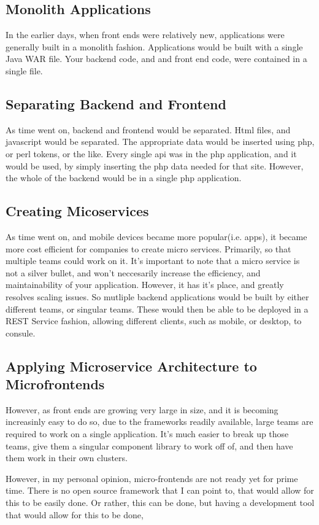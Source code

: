 \subsection{Monolith Applications}
In the earlier days, when front ends were relatively new, applications were generally built in a monolith fashion. Applications would be built with a single Java WAR file. Your backend code, and and front end code, were contained in a single file. 

\subsection{Separating Backend and Frontend}
As time went on, backend and frontend would be separated. Html files, and javascript would be separated. The appropriate data would be inserted using php, or perl tokens, or the like. Every single api was in the php application, and it would be used, by simply inserting the php data needed for that site. However, the whole of the backend would be in a single php application. 

\subsection{Creating Micoservices}
As time went on, and mobile devices became more popular(i.e. apps), it became more cost efficient for companies to create micro services. Primarily, so that multiple teams could work on it. It's important to note that a micro service is not a silver bullet, and won't neccesarily increase the efficiency, and maintainability of your application. However, it has it's place, and greatly resolves scaling issues. So mutliple backend applications would be built by either different teams, or singular teams. These would then be able to be deployed in a REST Service fashion, allowing different clients, such as mobile, or desktop, to consule. 

\subsection{Applying Microservice Architecture to Microfrontends}
However, as front ends are growing very large in size, and it is becoming increasinly easy to do so, due to the frameworks readily available, large teams are required to work on a single application. It's much easier to break up those teams, give them a singular component library to work off of, and then have them work in their own clusters. 

However, in my personal opinion, micro-frontends are not ready yet for prime time. There is no open source framework that I can point to, that would allow for this to be easily done. Or rather, this can be done, but having a development tool that would allow for this to be done, 

